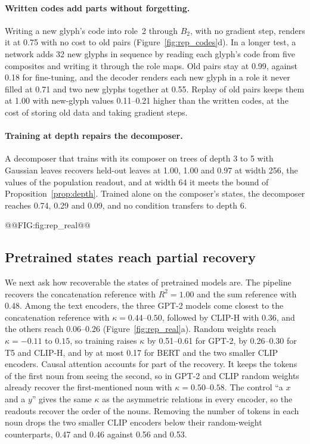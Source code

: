 \paragraph{Written codes add parts without forgetting.} Writing a new glyph's code into role~2 through $B_2$, with no gradient step, renders it at 0.75 with no cost to old pairs (Figure~\ref{fig:rep_codes}d). In a longer test, a network adds 32 new glyphs in sequence by reading each glyph's code from five composites and writing it through the role maps. Old pairs stay at 0.99, against 0.18 for fine-tuning, and the decoder renders each new glyph in a role it never filled at 0.71 and two new glyphs together at 0.55. Replay of old pairs keeps them at 1.00 with new-glyph values 0.11--0.21 higher than the written codes, at the cost of storing old data and taking gradient steps.

\paragraph{Training at depth repairs the decomposer.} A decomposer that trains with its composer on trees of depth 3 to 5 with Gaussian leaves recovers held-out leaves at 1.00, 1.00 and 0.97 at width 256, the values of the population readout, and at width 64 it meets the bound of Proposition~\ref{prop:depth}. Trained alone on the composer's states, the decomposer reaches 0.74, 0.29 and 0.09, and no condition transfers to depth 6.

@@FIG:fig:rep_real@@

\subsection{Pretrained states reach partial recovery}
\label{sec:pretrained}

We next ask how recoverable the states of pretrained models are. The pipeline recovers the concatenation reference with $R^2 = 1.00$ and the sum reference with 0.48. Among the text encoders, the three GPT-2 models come closest to the concatenation reference with $\kappa = 0.44$--$0.50$, followed by CLIP-H with 0.36, and the others reach 0.06--0.26 (Figure~\ref{fig:rep_real}a). Random weights reach $\kappa = -0.11$ to $0.15$, so training raises $\kappa$ by 0.51--0.61 for GPT-2, by 0.26--0.30 for T5 and CLIP-H, and by at most 0.17 for BERT and the two smaller CLIP encoders. Causal attention accounts for part of the recovery. It keeps the tokens of the first noun from seeing the second, so in GPT-2 and CLIP random weights already recover the first-mentioned noun with $\kappa = 0.50$--$0.58$. The control ``a $x$ and a $y$'' gives the same $\kappa$ as the asymmetric relations in every encoder, so the readouts recover the order of the nouns. Removing the number of tokens in each noun drops the two smaller CLIP encoders below their random-weight counterparts, 0.47 and 0.46 against 0.56 and 0.53.

